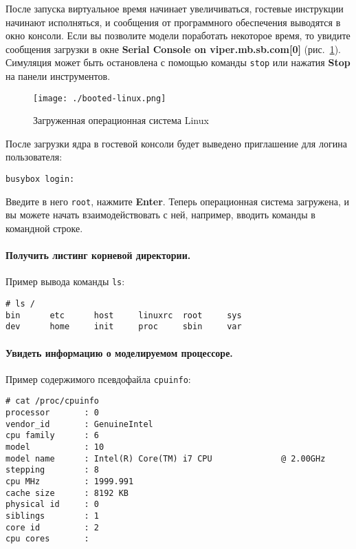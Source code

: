 После запуска виртуальное время начинает увеличиваться, гостевые инструкции начинают исполняться, и сообщения от программного обеспечения выводятся в окно консоли. Если вы позволите модели поработать некоторое время, то увидите сообщения загрузки в окне \textbf{Serial Console on viper.mb.sb.com[0]} (рис.~\ref{fig:booted-linux}). Симуляция может быть остановлена с помощью команды \texttt{stop} или нажатия \textbf{Stop} на панели инструментов.

\begin{figure}
	\centering
	\texttt{[image: ./booted-linux.png]}
	\caption{Загруженная операционная система Linux}
	\label{fig:booted-linux}
\end{figure}

После загрузки ядра в гостевой консоли будет выведено приглашение для логина пользователя:
\begin{lstlisting}
busybox login:
\end{lstlisting}

Введите в него \texttt{root}, нажмите \textbf{Enter}. Теперь операционная система загружена, и вы можете начать взаимодействовать с ней, например, вводить команды в командной строке.

\paragraph{Получить листинг корневой директории.} Пример вывода команды \texttt{ls}:

\begin{lstlisting}
# ls /
bin      etc      host     linuxrc  root     sys
dev      home     init     proc     sbin     var
\end{lstlisting}

\paragraph{Увидеть информацию о моделируемом процессоре.} Пример содержимого псевдофайла \texttt{cpuinfo}:

\begin{lstlisting}
# cat /proc/cpuinfo 
processor       : 0
vendor_id       : GenuineIntel
cpu family      : 6
model           : 10
model name      : Intel(R) Core(TM) i7 CPU              @ 2.00GHz
stepping        : 8
cpu MHz         : 1999.991
cache size      : 8192 KB
physical id     : 0
siblings        : 1
core id         : 2
cpu cores       : 
\end{lstlisting}

